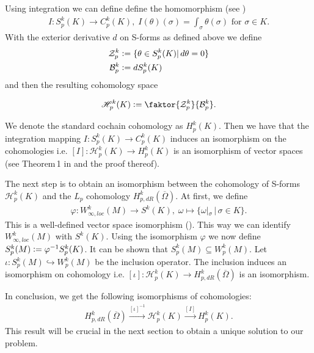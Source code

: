 \documentclass[12pt,a4paper]{article}
\theoremstyle{definition}
\newcommand{\lpcoho}{H^k_{p,dR}}
\newcommand{\omegabar}{\overline{\Omega}}
\begin{document}
Using integration we can define define the homomorphism 
(see \cite[p.191]{goldshtein})
\begin{align*}
I: S_p^k(K) \rightarrow C_p^k(K), \; I(\theta)(\sigma) = 
\int_\sigma \theta(\sigma) \text{ for } \sigma \in K.
\end{align*}
With the exterior derivative $d$ on S-forms as defined above we define 
\begin{align*}
    \mathcal{Z}_p^k &\vcentcolon= \{ \theta \in S^k_p(K) | \, d\theta = 0 \} \\
    \mathcal{B}_p^k &\vcentcolon= dS^k_p(K)
\end{align*}
and then the resulting cohomology space

\begin{align*}
    \mathscr{H}_p^k(K) \vcentcolon= 
    \faktor{\mathcal{Z}_p^k}{\mathcal{B}_p^k}.
\end{align*}

We denote the standard cochain cohomology as $H^k_p(K)$. Then we have that the 
integration mapping
$I: S_p^k(K) \rightarrow C_p^k(K)$ 
induces an isomorphism on the cohomologies i.e. %
$[I]: \mathscr{H}_p^k(K) \rightarrow H^k_p(K)$ is an isomorphism of vector 
spaces (see Theorem\,1 in \cite{goldshtein}
and the proof thereof).







The next step is to obtain an isomorphism between the cohomology 
of S-forms $\mathscr{H}_p^k(K)$ and the $L_p$ cohomology 
$\lpcoho(\omegabar)$. At first, we define 
\begin{align*}
\varphi: W^k_{\infty,loc}(M) \rightarrow S^k(K), \;
\omega \mapsto \{ \omega|_\sigma \, |\, \sigma \in K \}.
\end{align*}
This is a well-defined vector space isomorphism (\cite[p.191]{goldshtein}). This
way we can identify $W^k_{\infty,loc}(M)$ with $S^k(K)$.  Using the
isomorphism $\varphi$ we now define 
$S^k_p(M) \vcentcolon= \varphi^{-1} S^k_p(K)$.
It can be shown that $S^k_p(M) \subseteq W^k_p(M)$. Let 
$\iota: S^k_p(M) \hookrightarrow W^k_p(M)$ be the inclusion operator. 
The inclusion induces an
isomorphism on cohomology \cite[Lemma 4, Corollary]{goldshtein} i.e. 
$[\iota]: \mathscr{H}_p^k(K) \rightarrow \lpcoho(\omegabar)$ is an isomorphism. 


In conclusion, we get the following isomorphisms of cohomologies:
\begin{align*}
    \lpcoho(\omegabar) \xrightarrow{[\iota]^{-1}} \mathscr{H}_p^k(K) 
    \xrightarrow{[I]} H^k_p(K).
\end{align*}
This result will be crucial in the next section to obtain a unique solution
to our problem.
\end{document}
